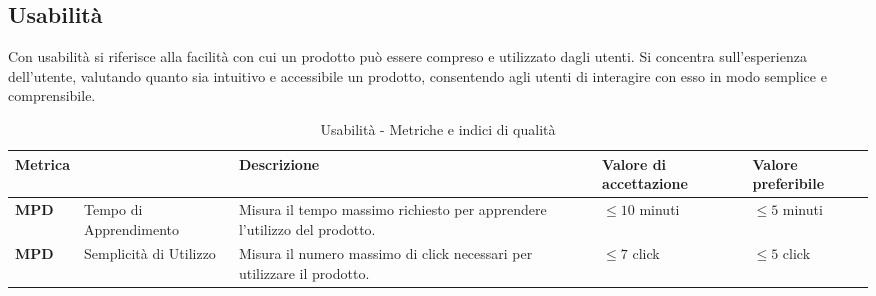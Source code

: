 \subsection{Usabilità}
Con usabilità si riferisce alla facilità con cui un prodotto può essere compreso e utilizzato dagli utenti. Si concentra sull'esperienza dell'utente, valutando quanto sia intuitivo e accessibile un prodotto, consentendo agli utenti di interagire con esso in modo semplice e comprensibile.  
\begin{table}[H]
    \centering
    \begin{tabular}{|C{1.5cm}|L{3cm}|L{4cm}|L{2.5cm}|L{2.5cm}|}
        \hline
        \textbf{Metrica} &  & \textbf{Descrizione} & \textbf{Valore di accettazione} & \textbf{Valore preferibile} \\
        \hline
        \textbf{MPD} & Tempo di Apprendimento & Misura il tempo massimo richiesto per apprendere l'utilizzo del prodotto. & $\leq 10$ minuti & $\leq 5$ minuti \\
        \hline
        \textbf{MPD} & Semplicità di Utilizzo & Misura il numero massimo di click necessari per utilizzare il prodotto. & $\leq 7$ click & $\leq 5$ click \\
        \hline
    \end{tabular}
    \caption{Usabilità - Metriche e indici di qualità}
    \label{tab:usabilità_qualita_prodotto}
\end{table}
